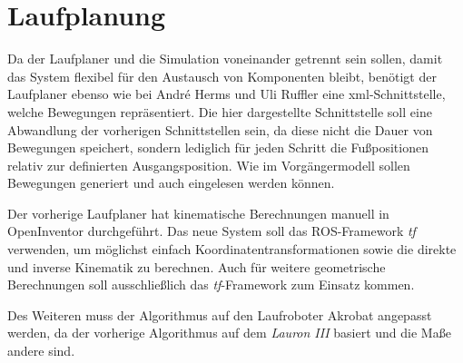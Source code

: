 \section{Laufplanung}

Da der Laufplaner und die Simulation voneinander getrennt sein sollen, damit das System flexibel für den Austausch von Komponenten bleibt, benötigt der Laufplaner ebenso wie bei André Herms und Uli Ruffler eine xml-Schnittstelle, welche Bewegungen repräsentiert. Die hier dargestellte Schnittstelle soll eine Abwandlung der vorherigen Schnittstellen sein, da diese nicht die Dauer von Bewegungen speichert, sondern lediglich für jeden Schritt die Fußpositionen relativ zur definierten Ausgangsposition. Wie im Vorgängermodell sollen Bewegungen generiert und auch eingelesen werden können.

Der vorherige Laufplaner hat kinematische Berechnungen manuell in OpenInventor durchgeführt. Das neue System soll das \ac{ROS}-Framework \emph{tf} verwenden, um möglichst einfach Koordinatentransformationen sowie die direkte und inverse Kinematik zu berechnen. Auch für weitere geometrische Berechnungen soll ausschließlich das \emph{tf}-Framework zum Einsatz kommen.

Des Weiteren muss der Algorithmus auf den Laufroboter Akrobat angepasst werden, da der vorherige Algorithmus auf dem \emph{Lauron III} basiert und die Maße andere sind.